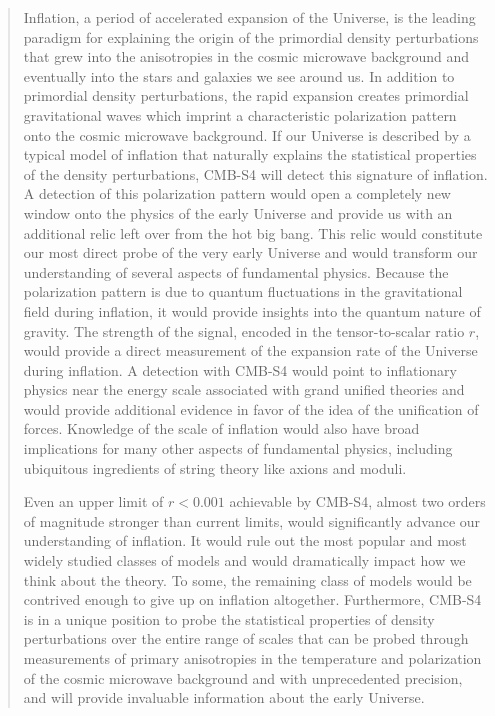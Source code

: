 \begin{quotation}

Inflation, a period of accelerated expansion of the Universe, is the leading paradigm for explaining the origin of the primordial density perturbations that grew into the anisotropies in the cosmic microwave background and eventually into the stars and galaxies we see around us. In addition to primordial density perturbations, the rapid expansion creates primordial gravitational waves which imprint a characteristic polarization pattern onto the cosmic microwave background. If our Universe is described by a typical model of inflation that naturally explains the statistical properties of the density perturbations, CMB-S4 will detect this signature of inflation. A detection of this polarization pattern would open a completely new window onto the physics of the early Universe and provide us with an additional relic left over from the hot big bang. This relic would constitute our most direct probe of the very early Universe and would transform our understanding of several aspects of fundamental physics. Because the polarization pattern is due to quantum fluctuations in the gravitational field during inflation, it would provide insights into the quantum nature of gravity. The strength of the signal, encoded in the tensor-to-scalar ratio $r$, would provide a direct measurement of the expansion rate of the Universe during inflation. A detection with CMB-S4 would point to inflationary physics near the energy scale associated with grand unified theories and would provide additional evidence in favor of the idea of the unification of forces. Knowledge of the scale of inflation would also have broad implications for many other aspects of fundamental physics, including ubiquitous ingredients of string theory like axions and moduli.


Even an upper limit of $r<0.001$ achievable by CMB-S4, almost two orders of magnitude stronger than current limits, would significantly advance our understanding of inflation. It would rule out the most popular and most widely studied classes of models and would dramatically impact how we think about the theory. To some, the remaining class of models would be contrived enough to give up on inflation altogether. Furthermore, CMB-S4 is in a unique position to probe the statistical properties of density perturbations over the entire range of scales that can be probed through measurements of primary anisotropies in the temperature and polarization of the cosmic microwave background and with unprecedented precision, and will provide invaluable information about the early Universe.

\end{quotation}


